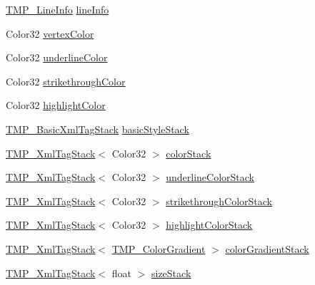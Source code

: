 \begin{DoxyCompactItemize}
\item 
\mbox{\hyperlink{struct_t_m_pro_1_1_t_m_p___line_info}{T\+M\+P\+\_\+\+Line\+Info}} \mbox{\hyperlink{struct_t_m_pro_1_1_word_wrap_state_a4283e006c1cafa0b315a1e3ed720088a}{line\+Info}}
\item 
Color32 \mbox{\hyperlink{struct_t_m_pro_1_1_word_wrap_state_aedc6e8de28278f3e628c5fbfaa4a8886}{vertex\+Color}}
\item 
Color32 \mbox{\hyperlink{struct_t_m_pro_1_1_word_wrap_state_a28990cf00ca1a09ab465f74ee4b06e92}{underline\+Color}}
\item 
Color32 \mbox{\hyperlink{struct_t_m_pro_1_1_word_wrap_state_a0a1ff363fc1343a9ff430d8a9a260244}{strikethrough\+Color}}
\item 
Color32 \mbox{\hyperlink{struct_t_m_pro_1_1_word_wrap_state_a5bda490f5876ad01a453a04442e2ccd7}{highlight\+Color}}
\item 
\mbox{\hyperlink{struct_t_m_pro_1_1_t_m_p___basic_xml_tag_stack}{T\+M\+P\+\_\+\+Basic\+Xml\+Tag\+Stack}} \mbox{\hyperlink{struct_t_m_pro_1_1_word_wrap_state_a0d29ddeb3a8f4cbfffe3a4d2b6a1b12f}{basic\+Style\+Stack}}
\item 
\mbox{\hyperlink{struct_t_m_pro_1_1_t_m_p___xml_tag_stack}{T\+M\+P\+\_\+\+Xml\+Tag\+Stack}}$<$ Color32 $>$ \mbox{\hyperlink{struct_t_m_pro_1_1_word_wrap_state_a4931cb815a6cbc174ada646020c60a3c}{color\+Stack}}
\item 
\mbox{\hyperlink{struct_t_m_pro_1_1_t_m_p___xml_tag_stack}{T\+M\+P\+\_\+\+Xml\+Tag\+Stack}}$<$ Color32 $>$ \mbox{\hyperlink{struct_t_m_pro_1_1_word_wrap_state_a93ac3792b8eb23ba91bd61270f1548de}{underline\+Color\+Stack}}
\item 
\mbox{\hyperlink{struct_t_m_pro_1_1_t_m_p___xml_tag_stack}{T\+M\+P\+\_\+\+Xml\+Tag\+Stack}}$<$ Color32 $>$ \mbox{\hyperlink{struct_t_m_pro_1_1_word_wrap_state_a0d5f142687895a885f77b290fb3e7c4f}{strikethrough\+Color\+Stack}}
\item 
\mbox{\hyperlink{struct_t_m_pro_1_1_t_m_p___xml_tag_stack}{T\+M\+P\+\_\+\+Xml\+Tag\+Stack}}$<$ Color32 $>$ \mbox{\hyperlink{struct_t_m_pro_1_1_word_wrap_state_aab7c976e5f328e4e28b4abeb32485a31}{highlight\+Color\+Stack}}
\item 
\mbox{\hyperlink{struct_t_m_pro_1_1_t_m_p___xml_tag_stack}{T\+M\+P\+\_\+\+Xml\+Tag\+Stack}}$<$ \mbox{\hyperlink{class_t_m_pro_1_1_t_m_p___color_gradient}{T\+M\+P\+\_\+\+Color\+Gradient}} $>$ \mbox{\hyperlink{struct_t_m_pro_1_1_word_wrap_state_a73159dc76e5aef8d21a466a210aaca8a}{color\+Gradient\+Stack}}
\item 
\mbox{\hyperlink{struct_t_m_pro_1_1_t_m_p___xml_tag_stack}{T\+M\+P\+\_\+\+Xml\+Tag\+Stack}}$<$ float $>$ \mbox{\hyperlink{struct_t_m_pro_1_1_word_wrap_state_a252a6ff05d76a6a371f3bcd139cb3819}{size\+Stack}}

\end{DoxyCompactItemize}
